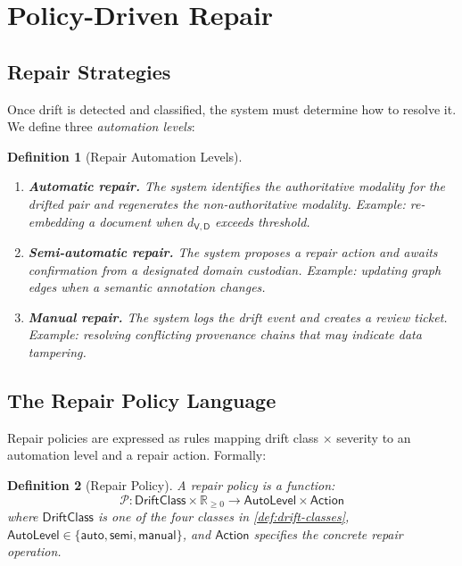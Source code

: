 \documentclass[11pt,twocolumn]{article}
\newtheorem{definition}{Definition}[section]
\newcommand{\policyfn}{\mathcal{P}}
\begin{document}
\section{Policy-Driven Repair}\label{sec:repair}

\subsection{Repair Strategies}

Once drift is detected and classified, the system must determine how to
resolve it.  We define three \emph{automation levels}:

\begin{definition}[Repair Automation Levels]
\begin{enumerate}[leftmargin=*]
  \item \textbf{Automatic repair.}  The system identifies the
    \emph{authoritative modality} for the drifted pair and regenerates
    the non-authoritative modality.  Example: re-embedding a document
    when $d_{\mathsf{V},\mathsf{D}}$ exceeds threshold.
  \item \textbf{Semi-automatic repair.}  The system proposes a repair
    action and awaits confirmation from a designated \emph{domain custodian}.
    Example: updating graph edges when a semantic annotation changes.
  \item \textbf{Manual repair.}  The system logs the drift event and
    creates a review ticket.  Example: resolving conflicting provenance
    chains that may indicate data tampering.
\end{enumerate}
\end{definition}

\subsection{The Repair Policy Language}

Repair policies are expressed as rules mapping drift class $\times$ severity
to an automation level and a repair action.  Formally:

\begin{definition}[Repair Policy]\label{def:repair-policy}
A \emph{repair policy} is a function:
\[
  \policyfn : \mathsf{DriftClass} \times \mathbb{R}_{\geq 0} \to
    \mathsf{AutoLevel} \times \mathsf{Action}
\]
where $\mathsf{DriftClass}$ is one of the four classes in
\cref{def:drift-classes}, $\mathsf{AutoLevel} \in \{
\mathsf{auto}, \mathsf{semi}, \mathsf{manual}\}$, and $\mathsf{Action}$
specifies the concrete repair operation.
\end{definition}
\end{document}
